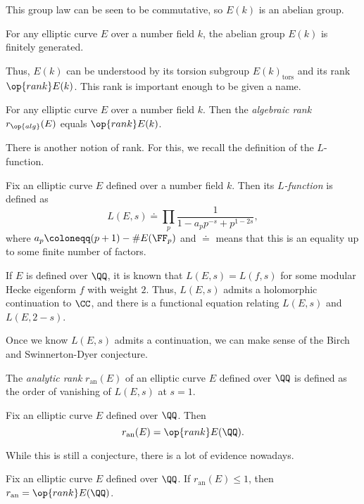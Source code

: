 \documentclass[../notes.tex]{subfiles}
\begin{document}
This group law can be seen to be commutative, so $E(k)$ is an abelian group.
\begin{theorem}
	For any elliptic curve $E$ over a number field $k$, the abelian group $E(k)$ is finitely generated.
\end{theorem}
Thus, $E(k)$ can be understood by its torsion subgroup $E(k)_{\mathrm{tors}}$ and its rank $\op{rank}E(k)$. This rank is important enough to be given a name.
\begin{definition}
	For any elliptic curve $E$ over a number field $k$. Then the \textit{algebraic rank} $r_{\op{alg}}(E)$ equals $\op{rank}E(k)$.
\end{definition}
There is another notion of rank. For this, we recall the definition of the $L$-function.
\begin{definition}
	Fix an elliptic curve $E$ defined over a number field $k$. Then its \textit{$L$-function} is defined as
	\[L(E,s)\doteq\prod_p\frac1{1-a_pp^{-s}+p^{1-2s}},\]
	where $a_p\coloneqq(p+1)-\#E(\FF_p)$ and $\doteq$ means that this is an equality up to some finite number of factors.
\end{definition}
\begin{remark}
	If $E$ is defined over $\QQ$, it is known that $L(E,s)=L(f,s)$ for some modular Hecke eigenform $f$ with weight $2$. Thus, $L(E,s)$ admits a holomorphic continuation to $\CC$, and there is a functional equation relating $L(E,s)$ and $L(E,2-s)$.
\end{remark}
Once we know $L(E,s)$ admits a continuation, we can make sense of the Birch and Swinnerton-Dyer conjecture.
\begin{definition}
	The \textit{analytic rank} $r_{\mathrm{an}}(E)$ of an elliptic curve $E$ defined over $\QQ$ is defined as the order of vanishing of $L(E,s)$ at $s=1$.
\end{definition}
\begin{conj}
	Fix an elliptic curve $E$ defined over $\QQ$. Then
	\[r_{\mathrm{an}}(E)=\op{rank}E(\QQ).\]
\end{conj}
While this is still a conjecture, there is a lot of evidence nowadays.
\begin{theorem}
	Fix an elliptic curve $E$ defined over $\QQ$. If $r_{\mathrm{an}}(E)\le1$, then $r_{\mathrm{an}}=\op{rank}E(\QQ)$.
\end{theorem}
\end{document}
